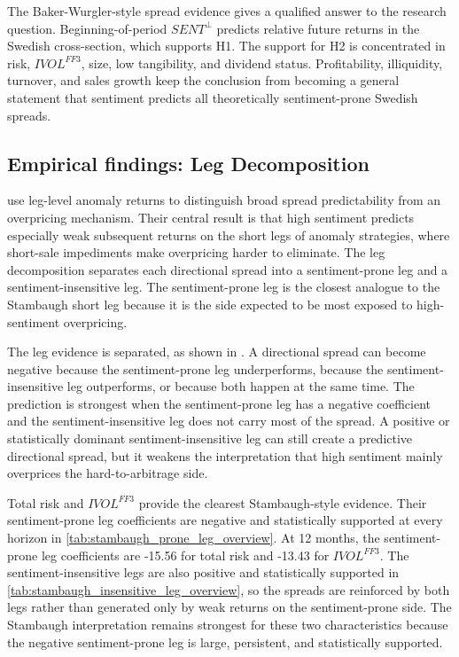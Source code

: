 \documentclass[11pt]{article}
\newcommand{\var}[1]{\ensuremath{#1}}
\begin{document}
The Baker-Wurgler-style spread evidence gives a qualified answer to the research question. Beginning-of-period \var{SENT^{\perp}} predicts relative future returns in the Swedish cross-section, which supports H1. The support for H2 is concentrated in risk, \var{IVOL^{FF3}}, size, low tangibility, and dividend status. Profitability, illiquidity, turnover, and sales growth keep the conclusion from becoming a general statement that sentiment predicts all theoretically sentiment-prone Swedish spreads.

\subsection{Empirical findings: Leg Decomposition}
\citet{stambaugh2012short} use leg-level anomaly returns to distinguish broad spread predictability from an overpricing mechanism. Their central result is that high sentiment predicts especially weak subsequent returns on the short legs of anomaly strategies, where short-sale impediments make overpricing harder to eliminate. The leg decomposition separates each directional spread into a sentiment-prone leg and a sentiment-insensitive leg. The sentiment-prone leg is the closest analogue to the Stambaugh short leg because it is the side expected to be most exposed to high-sentiment overpricing.

The leg evidence is separated, as shown in . A directional spread can become negative because the sentiment-prone leg underperforms, because the sentiment-insensitive leg outperforms, or because both happen at the same time. The prediction is strongest when the sentiment-prone leg has a negative coefficient and the sentiment-insensitive leg does not carry most of the spread. A positive or statistically dominant sentiment-insensitive leg can still create a predictive directional spread, but it weakens the interpretation that high sentiment mainly overprices the hard-to-arbitrage side.

Total risk and \var{IVOL^{FF3}} provide the clearest Stambaugh-style evidence. Their sentiment-prone leg coefficients are negative and statistically supported at every horizon in \cref{tab:stambaugh_prone_leg_overview}. At 12 months, the sentiment-prone leg coefficients are -15.56 for total risk and -13.43 for \var{IVOL^{FF3}}. The sentiment-insensitive legs are also positive and statistically supported in \cref{tab:stambaugh_insensitive_leg_overview}, so the spreads are reinforced by both legs rather than generated only by weak returns on the sentiment-prone side. The Stambaugh interpretation remains strongest for these two characteristics because the negative sentiment-prone leg is large, persistent, and statistically supported.
\end{document}
